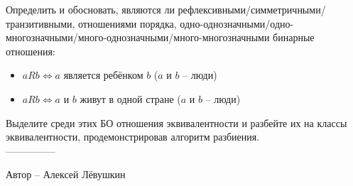 \question
Определить и обосновать, являются ли рефлексивными/симметричными/транзитивными, отношениями порядка, одно-однозначными/одно-многозначными/много-однозначными/много-многозначными бинарные отношения:
\begin{itemize}
    \item $aRb \Leftrightarrow a$ является ребёнком $b$ ($a$ и $b$ -- люди)
    \item $aRb \Leftrightarrow a$ и $b$ живут в одной стране ($a$ и $b$ -- люди)
\end{itemize}

Выделите среди этих БО отношения эквивалентности и разбейте их на классы эквивалентности, продемонстрировав алгоритм разбиения.
\\
---------------

Автор -- Алексей Лёвушкин